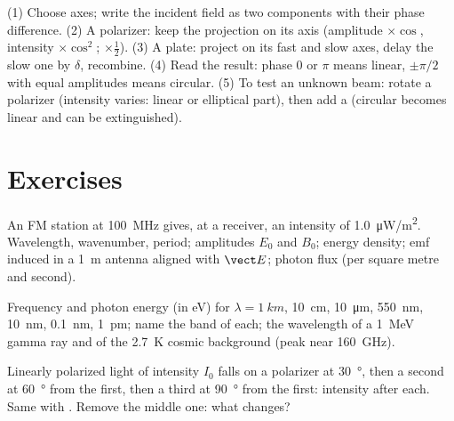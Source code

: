 \begin{method}\label{met:b2:plane-waves-polarization:method}
(1) Choose axes; write the incident field as two components with
their phase difference. (2) A polarizer: keep the projection on its
axis (amplitude $\times\cos$, intensity $\times\cos^2$; 
$\times\tfrac12$). (3) A plate: project on its fast and slow axes, delay
the slow one by $\delta$, recombine. (4) Read the result: phase $0$ or $\pi$
means linear, $\pm\pi/2$ with equal amplitudes means circular. (5) To
test an unknown beam: rotate a polarizer (intensity varies: linear or
elliptical part), then add a  (circular becomes
linear and can be extinguished).
\end{method}

\section{Exercises}

\begin{exercise}[$\star$]\label{exo:b2:plane-waves-polarization:1}
An FM station at \qty{100}{MHz} gives, at a receiver, an intensity of
\qty{1.0}{\micro W/m^2}. Wavelength, wavenumber, period; amplitudes $E_0$ and
$B_0$; energy density; emf induced in a \qty{1}{m} antenna aligned with
$\vect E$; photon flux (per square metre and second).
\end{exercise}

\begin{exercise}[$\star$]\label{exo:b2:plane-waves-polarization:2}
Frequency and photon energy (in eV) for $\lambda = \qty{1}{km}$, \qty{10}{cm},
\qty{10}{\micro m}, \qty{550}{nm}, \qty{10}{nm}, \qty{0.1}{nm}, \qty{1}{pm}; name the
band of each; the wavelength of a \qty{1}{MeV} gamma ray and of the
\qty{2.7}{K} cosmic background (peak near \qty{160}{GHz}).
\end{exercise}

\begin{exercise}[$\star$]\label{exo:b2:plane-waves-polarization:3}
Linearly polarized light of intensity $I_0$ falls on a polarizer at
\qty{30}{\degree}, then a second at \qty{60}{\degree} from the first, then a
third at \qty{90}{\degree} from the first: intensity after each. Same with
. Remove the middle one: what changes?
\end{exercise}

